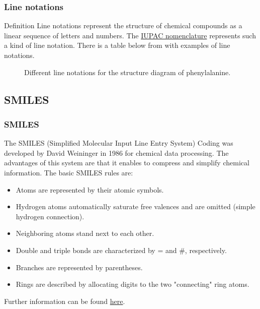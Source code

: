 \documentclass{beamer}
\begin{document}
\begin{frame}
\frametitle{Line notations}
\begin{block}{Definition}
Line notations represent the structure of chemical compounds as a linear sequence
of letters and numbers. The \href{https://iupac.org/what-we-do/nomenclature/}{IUPAC nomenclature} represents such a kind of line
notation. There is a table below from \cite{gasteiger2006chemoinformatics} with examples of line notations.
\end{block}
\begin{figure}[h!]
\caption{Different line notations for the structure diagram of phenylalanine\cite{gasteiger2006chemoinformatics}.}
\end{figure}
\end{frame}

\subsection{SMILES} 
\begin{frame}
\frametitle{SMILES}
The SMILES (Simplified Molecular Input Line Entry System) Coding was developed by David Weininger in 1986 for chemical data processing. The advantages of this system are that it enables to compress and simplify chemical information. 
The basic SMILES rules are:
\begin{itemize}
\item Atoms are represented by their atomic symbols.
\item Hydrogen atoms automatically saturate free valences and are omitted (simple
hydrogen connection).
\item Neighboring atoms stand next to each other.
\item Double and triple bonds are characterized by  = and \#, respectively.
\item Branches are represented by parentheses.
\item Rings are described by allocating digits to the two "connecting" ring atoms.
\end{itemize}
Further information can be found \href{http://www.daylight.com/dayhtml/smiles/index.html}{here}.
\end{frame}
\end{document}
